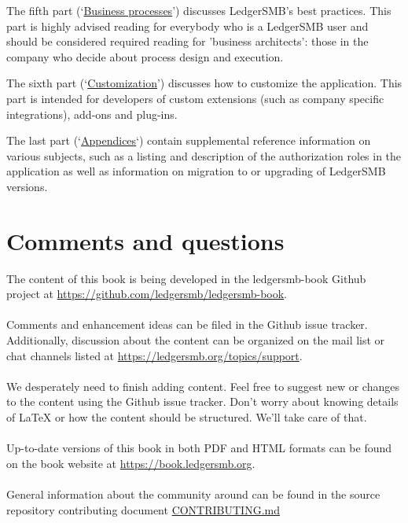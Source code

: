 The fifth part (\lq\hyperref[part-business-processes]{Business processes}\rq) discusses LedgerSMB's best practices. 
This part is highly advised
reading for everybody who is a LedgerSMB user and should be considered required reading for 'business
architects': those in the company who decide about process design and execution.

The sixth part (\lq\hyperref[part-customization]{Customization}\rq) discusses how to customize the application. 
This part is intended for developers of
custom extensions (such as company specific integrations), add-ons and plug-ins.

The last part (\lq\hyperref[part-appendices]{Appendices}\lq) contain supplemental reference information on various subjects, 
such as a listing and description
of the authorization roles in the application as well as information on migration to or upgrading of
LedgerSMB versions.


\section*{Comments and questions}
\label{sec-comments}

The content of this book is being developed in the ledgersmb-book Github project at
\url{https://github.com/ledgersmb/ledgersmb-book}. \\
~ \\
Comments and enhancement ideas can be filed in the Github issue tracker. 
Additionally, discussion about the content
can be organized on the mail list or chat channels listed at \url{https://ledgersmb.org/topics/support}.\\
~ \\
We desperately need to finish adding content. Feel free to suggest new or changes to the content
using the Github issue tracker. Don't worry about knowing details of \LaTeX{} or how the
content should be structured. We'll take care of that.\\
~ \\
Up-to-date versions of this book in both PDF and HTML formats can be found on the book website at \url{https://book.ledgersmb.org}.\\
~ \\
General information about the community around \lsmbsp can be found in the source repository contributing document
\href{https://github.com/ledgersmb/LedgerSMB/blob/master/CONTRIBUTING.md}{CONTRIBUTING.md}

